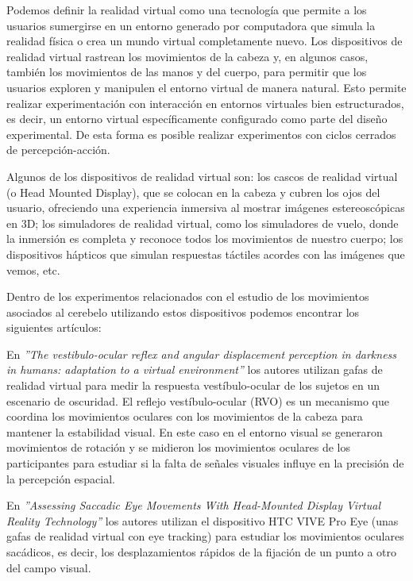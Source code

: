 \documentclass[a4paper,11pt, oneside]{book}
\begin{document}
Podemos definir la realidad virtual como una tecnología que permite a los usuarios sumergirse en un entorno generado por computadora que simula la realidad física o crea un mundo virtual completamente nuevo. Los dispositivos de realidad virtual rastrean los movimientos de la cabeza y, en algunos casos, también los movimientos de las manos y del cuerpo, para permitir que los usuarios exploren y manipulen el entorno virtual de manera natural. Esto permite realizar experimentación con interacción en entornos virtuales bien estructurados, es decir, un entorno virtual específicamente configurado como parte del diseño experimental. De esta forma es posible realizar experimentos con ciclos cerrados de percepción-acción. 

Algunos de los dispositivos de realidad virtual son: los cascos de realidad virtual (o Head Mounted Display), que se colocan en la cabeza y cubren los ojos del usuario, ofreciendo una experiencia inmersiva al mostrar imágenes estereoscópicas en 3D; los simuladores de realidad virtual, como los simuladores de vuelo, donde la inmersión es completa y reconoce todos los movimientos de nuestro cuerpo; los dispositivos hápticos que simulan respuestas táctiles acordes con las imágenes que vemos, etc.

Dentro de los experimentos relacionados con el estudio de los movimientos asociados al cerebelo utilizando estos dispositivos podemos encontrar los siguientes artículos:


En \textit{''The vestibulo-ocular reflex and angular displacement perception in darkness in humans: adaptation to a virtual environment''}\cite{vor} los autores utilizan gafas de realidad virtual para medir la respuesta vestíbulo-ocular de los sujetos en un escenario de oscuridad. El reflejo vestíbulo-ocular (RVO) es un mecanismo que coordina los movimientos oculares con los movimientos de la cabeza para mantener la estabilidad visual. En este caso en el entorno visual se generaron movimientos de rotación y se midieron los movimientos oculares de los participantes para estudiar si la falta de señales visuales influye en la precisión de la percepción espacial.


En \textit{''Assessing Saccadic Eye Movements
	With Head-Mounted Display Virtual
	Reality Technology''}\cite{saccadic} los autores utilizan el dispositivo HTC VIVE Pro Eye\cite{eye} (unas gafas de realidad virtual con eye tracking) para estudiar los movimientos oculares sacádicos, es decir, los desplazamientos rápidos de la fijación de un punto a otro del campo visual. 
	
\end{document}
